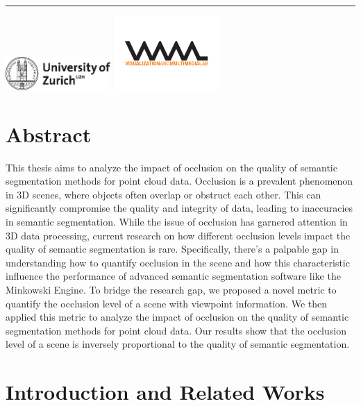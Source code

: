 \documentclass[11pt, a4paper,oneside,chapterprefix=false]{scrbook}
\newcommand{\FIXME}[1]{{\color{RED}{\textbf{FIX}: #1}}}
\begin{document}
\begin{titlepage}
	\vfill
	\hrule
	\vspace{0.5cm}
	\includegraphics*[width=0.3\textwidth]{figures/uzh_logo} \hfill
	\includegraphics*[width=0.3\textwidth]{figures/vmml_logo}
\end{titlepage}

\chapter{Abstract} \label{chp:abstract}

This thesis aims to analyze the impact of occlusion on the quality of semantic segmentation methods for point cloud data. Occlusion is a prevalent phenomenon in 3D scenes, where objects often overlap or obstruct each other. This can significantly compromise the quality and integrity of data, leading to inaccuracies in semantic segmentation. While the issue of occlusion has garnered attention in 3D data processing, current research on how different occlusion levels impact the quality of semantic segmentation is rare. Specifically, there's a palpable gap in understanding how to quantify occlusion in the scene and how this characteristic influence the performance of advanced semantic segmentation software like the Minkowski Engine. To bridge the research gap, we proposed a novel metric to quantify the occlusion level of a scene with viewpoint information. We then applied this metric to analyze the impact of occlusion on the quality of semantic segmentation methods for point cloud data. Our results show that the occlusion level of a scene \FIXME{not inverse} is inversely proportional to the quality of semantic segmentation.

\tableofcontents

\mainmatter

\chapter{Introduction and Related Works} \label{chp:introduction}
\end{document}
